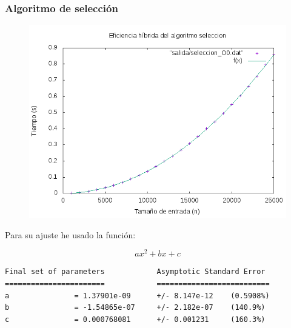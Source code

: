 \documentclass[spanish]{beamer}
\begin{document}
\begin{frame}\frametitle{Algoritmo de selección}
  \begin{figure}[H]
    \centering   
        \includegraphics[clip,width=1\columnwidth]{../plots/seleccion_O0_fit.png}%
    \end{figure}
  \end{frame}

\begin{frame}[fragile]
  Para su ajuste he usado la función:

  $$ax^2+bx+c$$
  
\scriptsize
\begin{verbatim}
Final set of parameters            Asymptotic Standard Error
=======================            ==========================
a               = 1.37901e-09      +/- 8.147e-12    (0.5908%)
b               = -1.54865e-07     +/- 2.182e-07    (140.9%)
c               = 0.000768081      +/- 0.001231     (160.3%)
\end{verbatim}
  
  
\end{frame}

%
%
\end{document}
